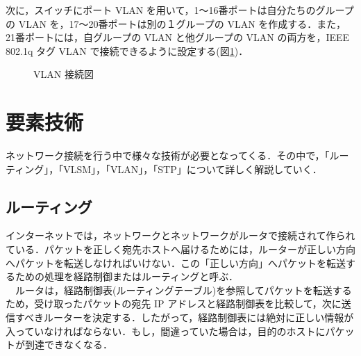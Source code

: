 \documentclass[a4j,titlepage]{jarticle}
\begin{document}
  \newpage
次に，スイッチにポート VLAN を用いて，1〜16番ポートは自分たちのグループの VLAN を，17〜20番ポートは別の１グループの VLAN を作成する．また，21番ポートには，自グループの VLAN と他グループの VLAN の両方を，IEEE 802.1q タグ VLAN で接続できるように設定する(図\ref{fig:vlan})．

  \begin{figure}[htbp]
    \begin{center}
      \caption{VLAN 接続図}
     \label{fig:vlan}
   \end{center}
  \end{figure}

\newpage
\section{要素技術}
ネットワーク接続を行う中で様々な技術が必要となってくる．その中で，「ルーティング」，「VLSM」，「VLAN」，「STP」について詳しく解説していく．

\subsection{ルーティング}
インターネットでは，ネットワークとネットワークがルータで接続されて作られている．パケットを正しく宛先ホストへ届けるためには，ルーターが正しい方向へパケットを転送しなければいけない．この「正しい方向」へパケットを転送するための処理を経路制御またはルーティングと呼ぶ．\\
　ルータは，経路制御表(ルーティングテーブル)を参照してパケットを転送するため，受け取ったパケットの宛先 IP アドレスと経路制御表を比較して，次に送信すべきルーターを決定する．したがって，経路制御表には絶対に正しい情報が入っていなければならない．もし，間違っていた場合は，目的のホストにパケットが到達できなくなる\cite{bib:iptext}．
\end{document}
